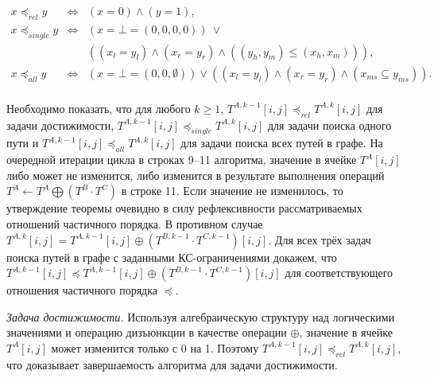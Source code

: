$$
\begin{array}{lcl}
   x \preceq_{\textit{rel}} y & \iff & (x = 0) \wedge (y = 1), \\ 
   x \preceq_{\textit{single}} y & \iff & (x = \bot = (0, 0, 0, 0)) \ \vee \\ 
    & & ((x_l = y_l) \wedge (x_r = y_r ) \wedge ((y_h, y_m) \leq (x_h, x_m)) ), \\ 
   x \preceq_{\textit{all}} y  & \iff & (x = \bot = (0, 0, \emptyset)) \vee ((x_l = y_l) \wedge (x_r = y_r) \wedge (x_{ms} \subseteq y_{ms}) ). \\ 
\end{array}
$$


Необходимо показать, что для любого $k \geq 1$, $T^{A, k - 1}[i, j] \preceq_{\textit{rel}} T^{A, k}[i, j]$ для задачи достижимости, $T^{A, k - 1}[i, j] \preceq_{\textit{single}} T^{A, k}[i, j]$ для задачи поиска одного пути и  $T^{A, k - 1}[i, j] \preceq_{\textit{all}} T^{A, k}[i, j]$ для задачи поиска всех путей в графе. На очередной итерации цикла в строках 9--11 алгоритма, значение в ячейке $T^A[i, j]$ либо может не изменится, либо изменится в результате выполнения операций $T^{A} \gets T^{A} \bigoplus (T^{B} \cdot T^{C})$ в строке 11. Если значение не изменилось, то утверждение теоремы очевидно в силу рефлексивности рассматриваемых отношений частичного порядка. В противном случае $T^{A, k}[i, j] = T^{A, k - 1}[i, j] \oplus (T^{B, k - 1} \cdot T^{C, k - 1})[i, j]$. Для всех трёх задач поиска путей в графе с заданными КС-ограничениями докажем, что $T^{A, k - 1}[i, j] \preceq T^{A, k - 1}[i, j] \oplus (T^{B, k - 1} \cdot T^{C, k - 1})[i, j]$ для соответствующего отношения частичного порядка $\preceq$.

\textit{Задача достижимости.} Используя алгебраическую структуру над логическими значениями и операцию дизъюнкции в качестве операции $\oplus$, значение в ячейке $T^A[i, j]$ может изменится только с 0 на 1. Поэтому $T^{A, k - 1}[i, j] \preceq_{\textit{rel}} T^{A, k}[i, j]$, что доказывает завершаемость алгоритма для задачи достижимости.

